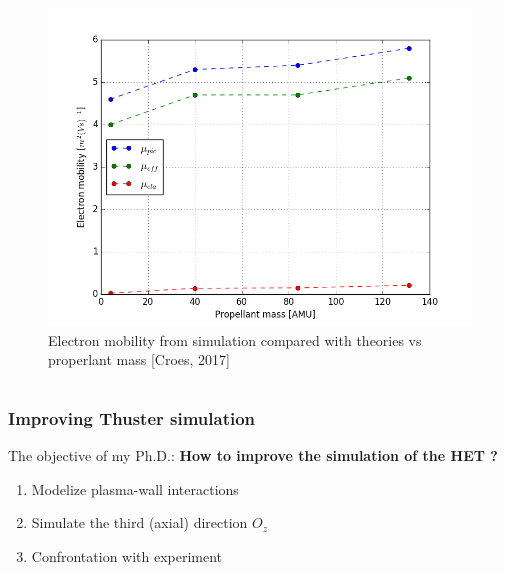\documentclass[sans, aspectratio=169]{beamer}
\begin{document}
\begin{frame}
\begin{columns}
	\begin{column}{0.5\linewidth}
	\begin{figure}[hbtp]
		\centering
		\includegraphics[scale=0.3]{images/mob_amu.png}
		\caption{Electron mobility from simulation compared with theories vs properlant mass [Croes, 2017]}
		\end{figure}
			
	\end{column}


\end{columns}


\end{frame}

\begin{frame} 
\frametitle{Improving Thuster simulation} 

The objective of my Ph.D.:\textbf{ How to improve the simulation of the HET ? }
\begin{enumerate}

	\item Modelize plasma-wall interactions
	
	\item Simulate the third (axial) direction $O_z$
	
	\item Confrontation with experiment
	
\end{enumerate}
\end{frame}
\end{document}
